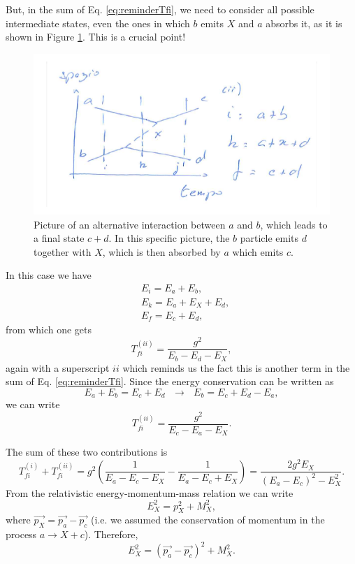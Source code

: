 But, in the sum of Eq. \eqref{eq:reminderTfi}, we need to consider all possible intermediate states, even the ones in which $b$ emits $X$ and $a$ absorbs it, as it is shown in Figure \ref{quantum-scattering:fig6}. This is a crucial point!
\begin{figure}
    \centering
    \includegraphics[scale=0.5]{Figures/qscat4.pdf}
    \caption{Picture of an alternative interaction between $a$ and $b$, which leads to a final state $c+d$. In this specific picture, the $b$ particle emits $d$ together with $X$, which is then absorbed by $a$ which emits $c$.}
    \label{quantum-scattering:fig6}
\end{figure}
In this case we have
\begin{align*}
        &E_{i} = E_{a}+E_{b},\\
        &E_{k} = E_{a}+E_{X}+E_{d},\\
         &E_{f} = E_{c}+E_{d},
    \end{align*}
from which one gets
\begin{equation*}
    T_{fi}^{(ii)} = \frac{g^2}{E_b-E_d-E_X},
\end{equation*}
again with a superscript $ii$ which reminds us the fact this is another term in the sum of Eq. \eqref{eq:reminderTfi}.
Since the energy conservation can be written as
\begin{equation*}
    E_a + E_b = E_c + E_d \,\,\,\,\rightarrow\,\,\,\, E_b = E_c + E_d - E_a,
\end{equation*}
we can write
\begin{equation*}
    T_{fi}^{(ii)} = \frac{g^2}{E_c-E_a-E_X}.
\end{equation*}

The sum of these two contributions is
\begin{equation*}
    T_{fi}^{(i)} + T_{fi}^{(ii)} = g^2 \left( \frac{1}{E_a-E_c-E_X} - \frac{1}{E_a-E_c+E_X} \right) = \frac{2g^2E_X}{(E_a-E_c)^2-E_X^2}.
\end{equation*}
From the relativistic energy-momentum-mass relation we can write
\begin{equation*}
    E_X^2 = p_X^2 + M_X^2,
\end{equation*}
where $\Vec{p_X} = \Vec{p_a} - \Vec{p_c}$ (i.e. we assumed the conservation of momentum in the process $a\to X+c$). Therefore,
\begin{equation*}
    E_X^2 = (\Vec{p_a} - \Vec{p_c})^2 + M_X^2.
\end{equation*}

